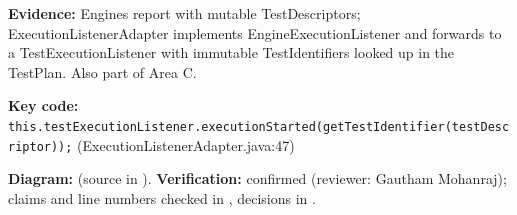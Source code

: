 \documentclass[11pt,a4paper]{article}
\begin{document}
\textbf{Evidence:} Engines report with mutable TestDescriptors; ExecutionListenerAdapter implements EngineExecutionListener and forwards to a TestExecutionListener with immutable TestIdentifiers looked up in the TestPlan. Also part of Area C.\par
\textbf{Key code:} \texttt{this.\allowbreak{}test\allowbreak{}Execution\allowbreak{}Listener.\allowbreak{}execution\allowbreak{}Started(get\allowbreak{}Test\allowbreak{}Identifier(test\allowbreak{}Descriptor));} (ExecutionListenerAdapter.java:47)\par
\textbf{Diagram:}  (source in ). \textbf{Verification:} confirmed (reviewer: Gautham Mohanraj); claims and line numbers checked in , decisions in .\par
\end{document}
